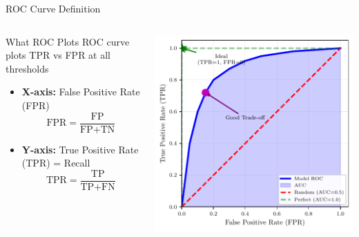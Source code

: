 \documentclass{beamer}
\begin{document}
\begin{frame}{ROC Curve Definition}
\begin{columns}
\begin{column}{0.48\textwidth}
\begin{definitionbox}{What ROC Plots}
\small
ROC curve plots TPR vs FPR at all thresholds

\vspace{0.15cm}

\begin{itemize}
    \item \textbf{X-axis:} False Positive Rate (FPR)
    $$\text{FPR} = \frac{\text{FP}}{\text{FP} + \text{TN}}$$

    \item \textbf{Y-axis:} True Positive Rate (TPR) = Recall
    $$\text{TPR} = \frac{\text{TP}}{\text{TP} + \text{FN}}$$
\end{itemize}
\end{definitionbox}
\end{column}
\begin{column}{0.48\textwidth}
\includegraphics[width=\textwidth]{roc-curve-diagram.pdf}
\end{column}
\end{columns}
\end{frame}
\end{document}

